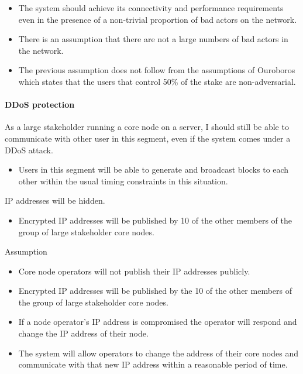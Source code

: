 \documentclass{report}
\theoremstyle{definition}{
  \newtheorem{lemma}{Lemma}[section] %
  \newtheorem{definition}[lemma]{Definition}
}
\theoremstyle{theorem}{
  \newtheorem{invariant}[lemma]{Invariant}
  \newtheorem{proofobligation}[lemma]{Proof Obligation}
}
\numberwithin{equation}{lemma}
\begin{document}
\begin{itemize}
\item The system should achieve its connectivity and performance requirements
      even in the presence of a non-trivial proportion of bad actors on the
      network.
\item There is an assumption that there are not a large numbers of bad actors
      in the network.
\item The previous assumption does not follow from the assumptions of Ouroboros
      which states that the users that control 50\% of the stake are
      non-adversarial.
\end{itemize}


\paragraph{DDoS protection}

As a large stakeholder running a core node on a server, I should still be able
to communicate with other user in this segment, even if the system comes under
a DDoS attack.

\begin{itemize}
\item Users in this segment will be able to generate and broadcast blocks to
      each other within the usual timing constraints in this situation.
\end{itemize}

IP addresses will be hidden.

\begin{itemize}
\item Encrypted IP addresses will be published by 10 of the other members of
      the group of large stakeholder core nodes.
\end{itemize}

Assumption

\begin{itemize}
\item Core node operators will not publish their IP addresses publicly.
\item Encrypted IP addresses will be published by the 10 of the other members
      of the group of large stakeholder core nodes.
\item If a node operator's IP address is compromised the operator will respond
      and change the IP address of their node.
\item The system will allow operators to change the address of their core nodes
      and communicate with that new IP address within a reasonable period of
      time.
\end{itemize}
\end{document}
